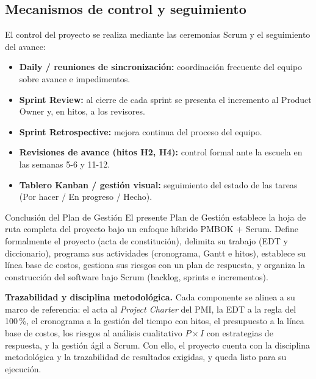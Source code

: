 \subsection{Mecanismos de control y seguimiento}

El control del proyecto se realiza mediante las ceremonias Scrum y el seguimiento del
avance:

\begin{itemize}[leftmargin=1.4em]
  \item \textbf{Daily / reuniones de sincronización:} coordinación frecuente del
  equipo sobre avance e impedimentos.
  \item \textbf{Sprint Review:} al cierre de cada sprint se presenta el incremento al
  Product Owner y, en hitos, a los revisores.
  \item \textbf{Sprint Retrospective:} mejora continua del proceso del equipo.
  \item \textbf{Revisiones de avance (hitos H2, H4):} control formal ante la escuela
  en las semanas 5-6 y 11-12.
  \item \textbf{Tablero Kanban / gestión visual:} seguimiento del estado de las tareas
  (Por hacer / En progreso / Hecho).
\end{itemize}

\begin{upeubox}{Conclusión del Plan de Gestión}
El presente Plan de Gestión establece la hoja de ruta completa del proyecto bajo un
enfoque híbrido PMBOK + Scrum. Define formalmente el proyecto (acta de constitución),
delimita su trabajo (EDT y diccionario), programa sus actividades (cronograma, Gantt e
hitos), establece su línea base de costos, gestiona sus riesgos con un plan de
respuesta, y organiza la construcción del software bajo Scrum (backlog, sprints e
incrementos).

\medskip
\textbf{Trazabilidad y disciplina metodológica.} Cada componente se alinea a su marco
de referencia: el acta al \textit{Project Charter} del PMI, la EDT a la regla del
100\,\%, el cronograma a la gestión del tiempo con hitos, el presupuesto a la línea
base de costos, los riesgos al análisis cualitativo $P\times I$ con estrategias de
respuesta, y la gestión ágil a Scrum. Con ello, el proyecto cuenta con la disciplina
metodológica y la trazabilidad de resultados exigidas, y queda listo para su ejecución.
\end{upeubox}
